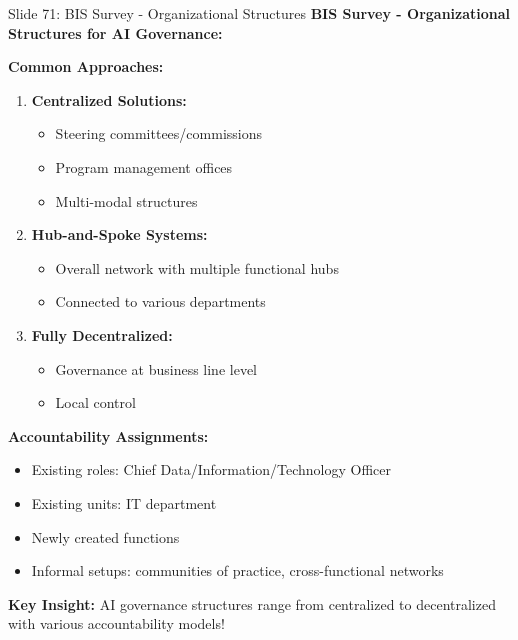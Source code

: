 \documentclass[8pt]{beamer}
\begin{document}
	\begin{frame}{Slide 71: BIS Survey - Organizational Structures}
		\fontsize{6.5}{7.5}\selectfont
		\textbf{BIS Survey - Organizational Structures for AI Governance:}
		
		\vspace{0.1cm}
		\textbf{Common Approaches:}
		\begin{enumerate}
			\item \textbf{Centralized Solutions:}
			\begin{itemize}
				\item Steering committees/commissions
				\item Program management offices
				\item Multi-modal structures
			\end{itemize}
			\item \textbf{Hub-and-Spoke Systems:}
			\begin{itemize}
				\item Overall network with multiple functional hubs
				\item Connected to various departments
			\end{itemize}
			\item \textbf{Fully Decentralized:}
			\begin{itemize}
				\item Governance at business line level
				\item Local control
			\end{itemize}
		\end{enumerate}
		
		\vspace{0.1cm}
		\textbf{Accountability Assignments:}
		\begin{itemize}
			\item Existing roles: Chief Data/Information/Technology Officer
			\item Existing units: IT department
			\item Newly created functions
			\item Informal setups: communities of practice, cross-functional networks
		\end{itemize}
		
		\textcolor{myblue}{\textbf{Key Insight:}} AI governance structures range from \textcolor{myblue}{centralized to decentralized with various accountability models}!
	\end{frame}
	
\end{document}
